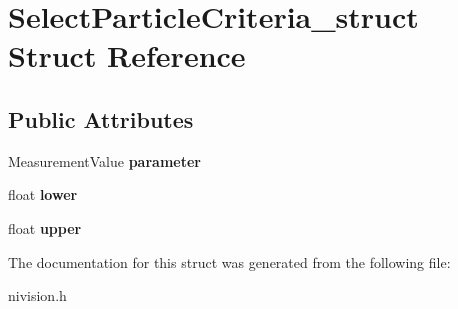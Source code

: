 \hypertarget{structSelectParticleCriteria__struct}{
\section{SelectParticleCriteria\_\-struct Struct Reference}
\label{structSelectParticleCriteria__struct}
}
\subsection*{Public Attributes}
\begin{DoxyCompactItemize}
\item 
\hypertarget{structSelectParticleCriteria__struct_a2593af3072aaea2b384ae165ece756a4}{
MeasurementValue {\bfseries parameter}}
\label{structSelectParticleCriteria__struct_a2593af3072aaea2b384ae165ece756a4}

\item 
\hypertarget{structSelectParticleCriteria__struct_a56514b0e8174f174236551c0510c1fff}{
float {\bfseries lower}}
\label{structSelectParticleCriteria__struct_a56514b0e8174f174236551c0510c1fff}

\item 
\hypertarget{structSelectParticleCriteria__struct_a2488971f38c35de53edef0dc7830fc01}{
float {\bfseries upper}}
\label{structSelectParticleCriteria__struct_a2488971f38c35de53edef0dc7830fc01}

\end{DoxyCompactItemize}


The documentation for this struct was generated from the following file:\begin{DoxyCompactItemize}
\item 
nivision.h\end{DoxyCompactItemize}
